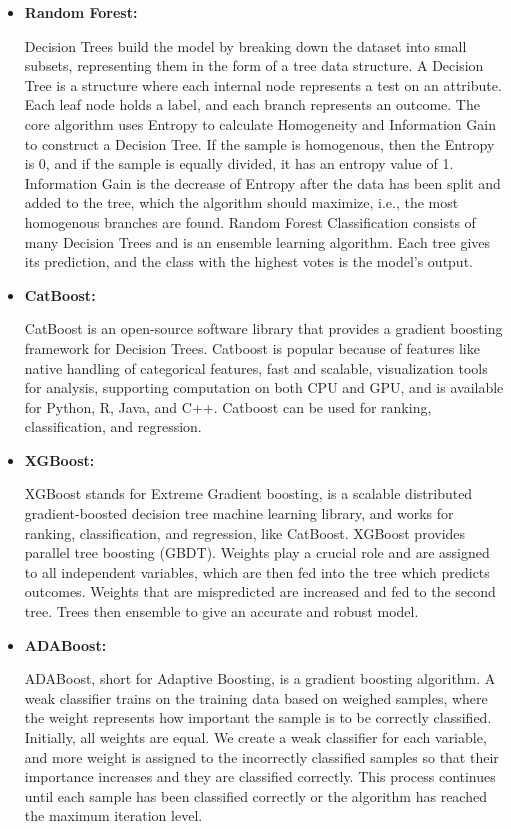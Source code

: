 \begin{itemize}
\item \textbf{Random Forest:}

Decision Trees build the model by breaking down the dataset into small subsets, representing them in the form of a tree data structure. A Decision Tree is a structure where each internal node represents a test on an attribute. Each leaf node holds a label, and each branch represents an outcome. The core algorithm uses Entropy to calculate Homogeneity and Information Gain to construct a Decision Tree. If the sample is homogenous, then the Entropy is 0, and if the sample is equally divided, it has an entropy value of 1. Information Gain is the decrease of Entropy after the data has been split and added to the tree, which the algorithm should maximize, i.e., the most homogenous branches are found.
Random Forest Classification consists of many Decision Trees and is an ensemble learning algorithm. Each tree gives its prediction, and the class with the highest votes is the model's output.


\item \textbf{CatBoost:}

CatBoost is an open-source software library that provides a gradient boosting framework for Decision Trees. Catboost is popular because of features like native handling of categorical features, fast and scalable, visualization tools for analysis, supporting computation on both CPU and GPU, and is available for Python, R, Java, and C++. Catboost can be used for ranking, classification, and regression.


\item \textbf{XGBoost:}

XGBoost stands for Extreme Gradient boosting, is a scalable distributed gradient-boosted decision tree machine learning library, and works for ranking, classification, and regression, like CatBoost. XGBoost provides parallel tree boosting (GBDT). Weights play a crucial role and are assigned to all independent variables, which are then fed into the tree which predicts outcomes. Weights that are mispredicted are increased and fed to the second tree. Trees then ensemble to give an accurate and robust model.


\item \textbf{ADABoost:}

ADABoost, short for Adaptive Boosting, is a gradient boosting algorithm. A weak classifier trains on the training data based on weighed samples, where the weight represents how important the sample is to be correctly classified. Initially, all weights are equal. We create a weak classifier for each variable, and more weight is assigned to the incorrectly classified samples so that their importance increases and they are classified correctly. This process continues until each sample has been classified correctly or the algorithm has reached the maximum iteration level.



\end{itemize}

